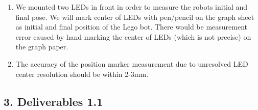 \documentclass[11pt,a4paper,openright,twoside]{extreport}
\begin{document}
\begin{enumerate}

\item We mounted two LEDs in front in order to measure the robots initial and final pose. We will mark center of LEDs with pen/pencil on the graph sheet as initial and final position of the Lego bot. There would be measurement error caused by hand marking the center of LEDs (which is not precise) on the graph paper.

\item The accuracy of the position marker measurement due to unresolved LED center resolution should be within 2-3mm.
\end{enumerate}

\subsection*{3. Deliverables 1.1}
\end{document}
